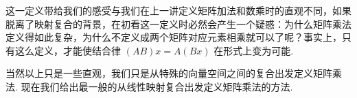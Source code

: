 这一定义带给我们的感受与我们在上一讲定义矩阵加法和数乘时的直观不同，如果脱离了映射复合的背景，在初看这一定义时必然会产生一个疑惑：为什么矩阵乘法定义得如此复杂，为什么不定义成两个矩阵对应元素相乘就可以了呢？事实上，只有这么定义，才能使结合律 $(AB)x = A(Bx)$ 在形式上变为可能.


当然以上只是一些直观，我们只是从特殊的向量空间之间的复合出发定义矩阵乘法. 现在我们给出最一般的从线性映射复合出发定义矩阵乘法的方法.

